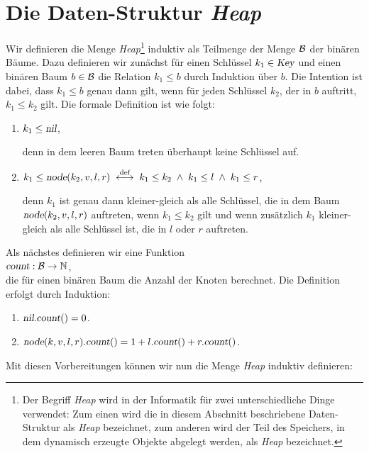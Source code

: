 \section{Die Daten-Struktur \emph{Heap}}
Wir definieren die Menge \textsl{Heap}\footnote{
Der Begriff \textsl{Heap} wird in der Informatik f\"ur zwei unterschiedliche Dinge
verwendet:  Zum einen wird die in diesem Abschnitt beschriebene Daten-Struktur als
\textsl{Heap} bezeichnet, zum anderen wird der Teil des Speichers, in dem dynamisch
erzeugte Objekte abgelegt werden, als \textsl{Heap} bezeichnet.}
induktiv als Teilmenge der Menge $\mathcal{B}$ der
bin\"aren B\"aume. Dazu definieren wir zun\"achst f\"ur einen Schl\"ussel $k_1\in \textsl{Key}$ und
einen bin\"aren Baum $b \in \mathcal{B}$ die Relation $k_1 \leq b$ durch Induktion \"uber $b$.
Die Intention ist dabei, dass $k_1 \leq b$ genau dann gilt, wenn f\"ur jeden Schl\"ussel $k_2$,
der in $b$ auftritt,  $k_1 \leq k_2$ gilt. Die formale Definition ist wie folgt:
\begin{enumerate}
\item $k_1 \leq \textsl{nil}$,

      denn in dem leeren Baum treten \"uberhaupt keine Schl\"ussel auf.
\item $k_1 \leq \textsl{node}(k_2,v,l,r) \;\stackrel{\mbox{\scriptsize def}}{\longleftrightarrow}\; k_1 \leq k_2 \;\wedge\; k_1 \leq l \;\wedge\; k_1 \leq r$,
         
      denn $k_1$ ist genau dann kleiner-gleich als alle Schl\"ussel, die in dem Baum 
      $\textsl{node}(k_2,v,l,r)$ auftreten, wenn $k_1 \leq k_2$ gilt und wenn zus\"atzlich
      $k_1$ kleiner-gleich als alle Schl\"ussel ist, die in $l$ oder $r$ auftreten.
\end{enumerate}
Als n\"achstes definieren wir eine Funktion \\[0.1cm]
\hspace*{1.3cm} $\textsl{count}: \mathcal{B} \rightarrow \mathbb{N}$, \\[0.1cm]
die f\"ur einen bin\"aren Baum die Anzahl der Knoten berechnet.  Die Definition erfolgt durch
Induktion:
\begin{enumerate}
\item $\textsl{nil}.\textsl{count}() = 0$.
\item $\textsl{node}(k,v,l,r).\textsl{count}() = 1 + l.\textsl{count}() + r.\textsl{count}()$.
\end{enumerate}
Mit diesen Vorbereitungen k\"onnen wir nun die Menge \textsl{Heap} induktiv definieren:
